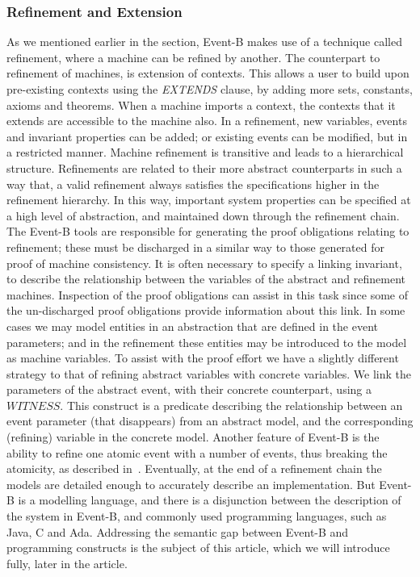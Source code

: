 \subsubsection{Refinement and Extension}\label{ref}
As we mentioned earlier in the section, Event-B makes use of a technique called refinement, where a machine can be refined by another. The counterpart to refinement of machines, is extension of contexts. This allows a user to build upon pre-existing contexts using the \emph{EXTENDS} clause, by adding more sets, constants, axioms and theorems. When a machine imports a context, the contexts that it extends are accessible to the machine also. In a refinement, new variables, events and invariant properties can be added; or existing events can be modified, but in a restricted manner. Machine refinement is transitive and leads to a hierarchical structure. Refinements are related to their more abstract counterparts in such a way that, a valid refinement always satisfies the specifications higher in the refinement hierarchy. In this way, important system properties can be specified at a high level of abstraction, and maintained down through the refinement chain. The Event-B tools are responsible for generating the proof obligations relating to refinement; these must be discharged in a similar way to those generated for proof of machine consistency. It is often necessary to specify a linking invariant, to describe the relationship between the variables of the abstract and refinement machines. Inspection of the proof obligations can assist in this task since some of the un-discharged proof obligations provide information about this link. In some cases we may model entities in an abstraction that are defined in the event parameters; and in the refinement these entities may be introduced to the model as machine variables. To assist with the proof effort we have a slightly different strategy to that of refining abstract variables with concrete variables. We link the parameters of the abstract event, with their concrete counterpart, using a $WITNESS$. This construct is a predicate describing the relationship between an event parameter (that disappears) from an abstract model, and the corresponding (refining) variable in the concrete model. Another feature of Event-B is the ability to  refine one atomic event with a number of events, thus breaking the atomicity, as described in~\cite{Butler08}. Eventually, at the end of a refinement chain the models are detailed enough to accurately describe an implementation. But Event-B is a modelling language, and there is a disjunction between the description of the system in Event-B, and commonly used programming languages, such as Java, C and Ada. Addressing the semantic gap between Event-B and programming constructs is the subject of this article, which we will introduce fully, later in the article. 
%
%
%
